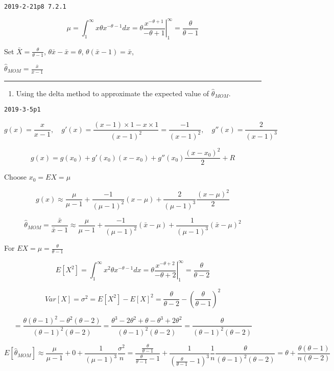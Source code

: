\documentclass[12pt,]{article}
\providecommand{\tightlist}{%
  \setlength{\itemsep}{0pt}\setlength{\parskip}{0pt}}
\begin{document}
\texttt{2019-2-21p8\ 7.2.1}

\[\mu=\int_1^{\infty}x\theta x^{-\theta-1}dx=\left.\theta\frac{x^{-\theta+1}}{-\theta+1}\right|_1^{\infty}=\frac\theta{\theta-1}\]

Set \(\bar X=\frac\theta{\theta-1}\), \(\theta\bar x-\bar x=\theta\),
\(\theta(\bar x-1)=\bar x\),

\(\hat\theta_{MOM}=\frac{\bar x}{\bar x-1}\)

\begin{center}\rule{0.5\linewidth}{\linethickness}\end{center}

\begin{enumerate}
\def\labelenumi{\alph{enumi}.}
\setcounter{enumi}{1}
\tightlist
\item
  \textcolor[rgb]{0.5,0.5,0.5}{Using the delta method to approximate the expected value of $\hat\theta_{MOM}$.}
\end{enumerate}

\texttt{2019-3-5p1}

\[g(x)=\frac{x}{x-1},\quad g'(x)=\frac{(x-1)\times1-x\times1}{(x-1)^2}=\frac{-1}{(x-1)^2},\quad g''(x)=\frac{2}{(x-1)^3}\]

\[g(x)=g(x_0)+g'(x_0)(x-x_0)+g''(x_0)\frac{(x-x_0)^2}2+R\]

Choose \(x_0=EX=\mu\)

\[g(x)\approx \frac{\mu}{\mu-1}+\frac{-1}{(\mu-1)^2}(x-\mu)+\frac{2}{(\mu-1)^3}\frac{(x-\mu)^2}2\]

\[\hat\theta_{MOM}=\frac{\bar x}{\bar x-1}\approx \frac{\mu}{\mu-1}+\frac{-1}{(\mu-1)^2}(\bar x-\mu)+\frac{1}{(\mu-1)^3}(\bar x-\mu)^2\]

For \(EX=\mu=\frac\theta{\theta-1}\)

\[E[X^2]=\int_1^{\infty}x^2\theta x^{-\theta-1}dx=\left.\theta\frac{x^{-\theta+2}}{-\theta+2}\right|_1^{\infty}=\frac\theta{\theta-2}\]

\[Var[X]=\sigma^2=E[X^2]-E[X]^2=\frac\theta{\theta-2}-(\frac\theta{\theta-1})^2\]

\[=\frac{\theta(\theta-1)^2-\theta^2(\theta-2)}{(\theta-1)^2(\theta-2)}=\frac{\theta^3-2\theta^2+\theta-\theta^3+2\theta^2}{(\theta-1)^2(\theta-2)}=\frac{\theta}{(\theta-1)^2(\theta-2)}\]

\[E[\hat\theta_{MOM}]\approx \frac{\mu}{\mu-1}+0+\frac{1}{(\mu-1)^3}\frac{\sigma^2}n=\frac{\frac\theta{\theta-1}}{\frac\theta{\theta-1}-1}+\frac{1}{(\frac\theta{\theta-1}-1)^3}\frac1n\frac{\theta}{(\theta-1)^2(\theta-2)}=\theta+\frac{\theta(\theta-1)}{n(\theta-2)}\]
\end{document}
